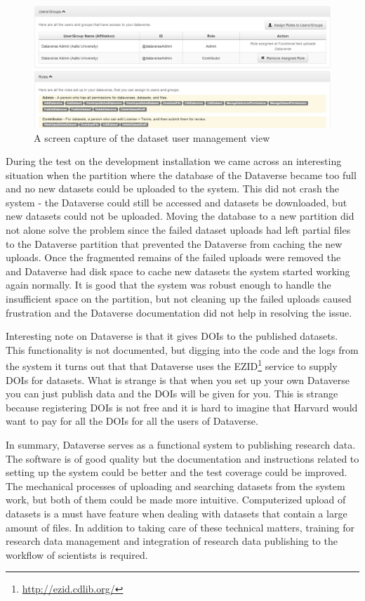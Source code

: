 \begin{figure}
    \begin{centering}
        \includegraphics[width=\textwidth]{images/admin}
    \end{centering}
    \caption{A screen capture of the dataset user management view}
    \label{fig:admin}
\end{figure}

During the test on the development installation we came across an interesting
situation when the partition where the database of the Dataverse became too
full and no new datasets could be uploaded to the system. This did not crash
the system - the Dataverse could still be accessed and datasets be downloaded,
but new datasets could not be uploaded. Moving the database to a new partition
did not alone solve the problem since the failed dataset uploads had left
partial files to the Dataverse partition that prevented the Dataverse from
caching the new uploads. Once the fragmented remains of the failed uploads
were removed the and Dataverse had disk space to cache new datasets the system
started working again normally. It is good that the system was robust enough
to handle the insufficient space on the partition, but not cleaning up the
failed uploads caused frustration and the Dataverse documentation did not
help in resolving the issue.

Interesting note on Dataverse is that it gives DOIs to the published datasets.
This functionality is not documented, but digging into the code and the logs
from the system it turns out that that Dataverse uses the
EZID\footnote{\url{http://ezid.cdlib.org/}} service to supply DOIs for
datasets. What is strange is that when you set up your own Dataverse you
can just publish data and the DOIs will be given for you. This is strange
because registering DOIs is not free and it is hard to imagine that Harvard
would want to pay for all the DOIs for all the users of Dataverse.

In summary, Dataverse serves as a functional system to publishing research
data. The software is of good quality but the documentation and instructions
related to setting up the system could be better and the test coverage could be
improved. The mechanical processes of
uploading and searching datasets from the system work, but both of them could
be made more intuitive. Computerized upload of datasets is a must have feature
when dealing with datasets that contain a large amount of files. In addition to
taking care of these technical matters, training for research data management
and integration of research data publishing to the workflow of scientists is
required.

